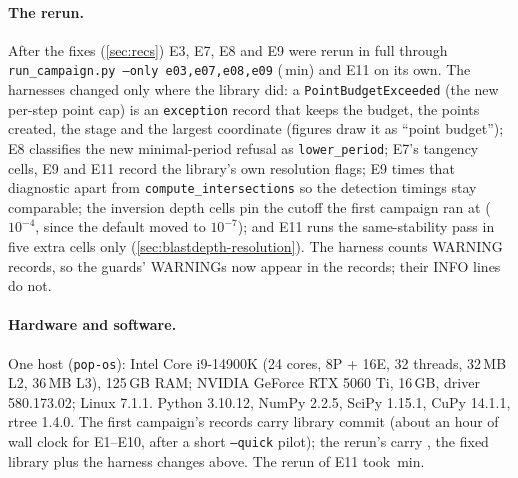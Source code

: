 \documentclass[11pt,a4paper]{article}
\newcommand{\code}[1]{\texttt{#1}}
\begin{document}
\paragraph{The rerun.} After the fixes (\cref{sec:recs}) E3, E7, E8 and E9
were rerun in full through \code{run\_campaign.py --only e03,e07,e08,e09}
(\NumRerunCampaignMin\,min) and E11 on its own. The harnesses changed only
where the library did: a \code{PointBudgetExceeded} (the new per-step point
cap) is an \code{exception} record that keeps the budget, the points
created, the stage and the largest coordinate (figures draw it as ``point
budget''); E8 classifies the new minimal-period refusal as
\code{lower\_period}; E7's tangency cells, E9 and E11 record the library's
own resolution flags; E9 times that diagnostic apart from
\code{compute\_intersections} so the detection timings stay comparable; the
inversion depth cells pin the cutoff the first campaign ran at ($10^{-4}$,
since the default moved to $10^{-7}$); and E11 runs the same-stability pass
in five extra cells only (\cref{sec:blastdepth-resolution}). The harness
counts WARNING records, so the guards' WARNINGs now appear in the records;
their INFO lines do not.

\paragraph{Hardware and software.} One host (\code{pop-os}): Intel Core
i9-14900K (24 cores, 8P + 16E, 32 threads, 32\,MB L2, 36\,MB L3), 125\,GB
RAM; NVIDIA GeForce RTX 5060 Ti, 16\,GB, driver 580.173.02; Linux 7.1.1.
Python 3.10.12, NumPy 2.2.5, SciPy 1.15.1, CuPy 14.1.1, rtree 1.4.0. The
first campaign's records carry library commit \NumFirstCommit{} (about an
hour of wall clock for E1--E10, after a short \code{--quick} pilot); the
rerun's carry \NumRerunCommit, the fixed library plus the harness changes
above. The rerun of E11 took \NumDeepWallMin\,min.
\end{document}
